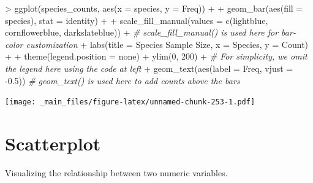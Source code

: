 \documentclass[
]{book}
\newenvironment{Shaded}{\begin{snugshade}}{\end{snugshade}}
\newcommand{\AttributeTok}[1]{\textcolor[rgb]{0.77,0.63,0.00}{#1}}
\newcommand{\CommentTok}[1]{\textcolor[rgb]{0.56,0.35,0.01}{\textit{#1}}}
\newcommand{\DecValTok}[1]{\textcolor[rgb]{0.00,0.00,0.81}{#1}}
\newcommand{\FloatTok}[1]{\textcolor[rgb]{0.00,0.00,0.81}{#1}}
\newcommand{\FunctionTok}[1]{\textcolor[rgb]{0.00,0.00,0.00}{#1}}
\newcommand{\NormalTok}[1]{#1}
\newcommand{\SpecialCharTok}[1]{\textcolor[rgb]{0.00,0.00,0.00}{#1}}
\newcommand{\StringTok}[1]{\textcolor[rgb]{0.31,0.60,0.02}{#1}}
\begin{document}
\begin{Shaded}
\begin{Highlighting}[]
\SpecialCharTok{\textgreater{}} \FunctionTok{ggplot}\NormalTok{(species\_counts, }\FunctionTok{aes}\NormalTok{(}\AttributeTok{x =}\NormalTok{ species, }\AttributeTok{y =}\NormalTok{ Freq)) }\SpecialCharTok{+}
\SpecialCharTok{+}   \FunctionTok{geom\_bar}\NormalTok{(}\FunctionTok{aes}\NormalTok{(}\AttributeTok{fill =}\NormalTok{ species), }\AttributeTok{stat =} \StringTok{\textquotesingle{}identity\textquotesingle{}}\NormalTok{) }\SpecialCharTok{+}
\SpecialCharTok{+}   \FunctionTok{scale\_fill\_manual}\NormalTok{(}\AttributeTok{values =} \FunctionTok{c}\NormalTok{(}\StringTok{\textquotesingle{}lightblue\textquotesingle{}}\NormalTok{, }\StringTok{\textquotesingle{}cornflowerblue\textquotesingle{}}\NormalTok{, }\StringTok{\textquotesingle{}darkslateblue\textquotesingle{}}\NormalTok{)) }\SpecialCharTok{+} \CommentTok{\# scale\_fill\_manual() is used here for bar{-}color customization}
\SpecialCharTok{+}   \FunctionTok{labs}\NormalTok{(}\AttributeTok{title =} \StringTok{\textquotesingle{}Species Sample Size\textquotesingle{}}\NormalTok{, }\AttributeTok{x =} \StringTok{\textquotesingle{}Species\textquotesingle{}}\NormalTok{, }\AttributeTok{y =} \StringTok{\textquotesingle{}Count\textquotesingle{}}\NormalTok{) }\SpecialCharTok{+}
\SpecialCharTok{+}   \FunctionTok{theme}\NormalTok{(}\AttributeTok{legend.position =} \StringTok{\textquotesingle{}none\textquotesingle{}}\NormalTok{) }\SpecialCharTok{+} \FunctionTok{ylim}\NormalTok{(}\DecValTok{0}\NormalTok{, }\DecValTok{200}\NormalTok{) }\SpecialCharTok{+} \CommentTok{\# For simplicity, we omit the legend here using the code at left}
\SpecialCharTok{+}   \FunctionTok{geom\_text}\NormalTok{(}\FunctionTok{aes}\NormalTok{(}\AttributeTok{label =}\NormalTok{ Freq, }\AttributeTok{vjust =} \SpecialCharTok{{-}}\FloatTok{0.5}\NormalTok{)) }\CommentTok{\# geom\_text() is used here to add counts above the bars}
\end{Highlighting}
\end{Shaded}

\texttt{[image: \_main\_files/figure-latex/unnamed-chunk-253-1.pdf]}

\hypertarget{scatterplot}{%
\section{Scatterplot}\label{scatterplot}}

Visualizing the relationship between two numeric variables.
\end{document}
